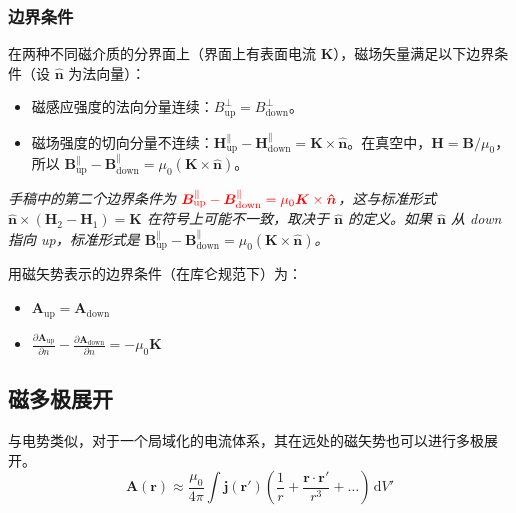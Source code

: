 \documentclass[fontset=none]{ctexart}
\begin{document}
\subsubsection{边界条件}
在两种不同磁介质的分界面上（界面上有表面电流 $\bm{K}$），磁场矢量满足以下边界条件（设 $\bm{\hat{n}}$ 为法向量）：
\begin{itemize}
    \item 磁感应强度的法向分量连续：$B_{\text{up}}^{\perp} = B_{\text{down}}^{\perp}$。
    \item 磁场强度的切向分量不连续：$\bm{H}_{\text{up}}^{\parallel} - \bm{H}_{\text{down}}^{\parallel} = \bm{K} \times \bm{\hat{n}}$。在真空中，$\bm{H} = \bm{B}/\mu_0$，所以 $\bm{B}_{\text{up}}^{\parallel} - \bm{B}_{\text{down}}^{\parallel} = \mu_0 (\bm{K} \times \bm{\hat{n}})$。
\end{itemize}
\textit{手稿中的第二个边界条件为 $\textcolor{red}{\bm{B}_{\text{up}}^{\parallel} - \bm{B}_{\text{down}}^{\parallel} = \mu_0 \bm{K} \times \bm{\hat{n}}}$，这与标准形式 $\bm{\hat{n}} \times (\bm{H}_2 - \bm{H}_1) = \bm{K}$ 在符号上可能不一致，取决于 $\bm{\hat{n}}$ 的定义。如果 $\bm{\hat{n}}$ 从 down 指向 up，标准形式是 $\bm{B}_{\text{up}}^{\parallel} - \bm{B}_{\text{down}}^{\parallel} = \mu_0 (\bm{K} \times \bm{\hat{n}})$。}

用磁矢势表示的边界条件（在库仑规范下）为：
\begin{itemize}
    \item $\bm{A}_{\text{up}} = \bm{A}_{\text{down}}$
    \item $\frac{\partial \bm{A}_{\text{up}}}{\partial n} - \frac{\partial \bm{A}_{\text{down}}}{\partial n} = -\mu_0 \bm{K}$
\end{itemize}

\subsection{磁多极展开}
与电势类似，对于一个局域化的电流体系，其在远处的磁矢势也可以进行多极展开。
\begin{equation}
    \bm{A}(\bm{r}) \approx \frac{\mu_0}{4\pi} \int \bm{j}(\bm{r'}) \left( \frac{1}{r} + \frac{\bm{r} \cdot \bm{r'}}{r^3} + \dots \right) \, \mathrm{d}V'
\end{equation}
\end{document}
